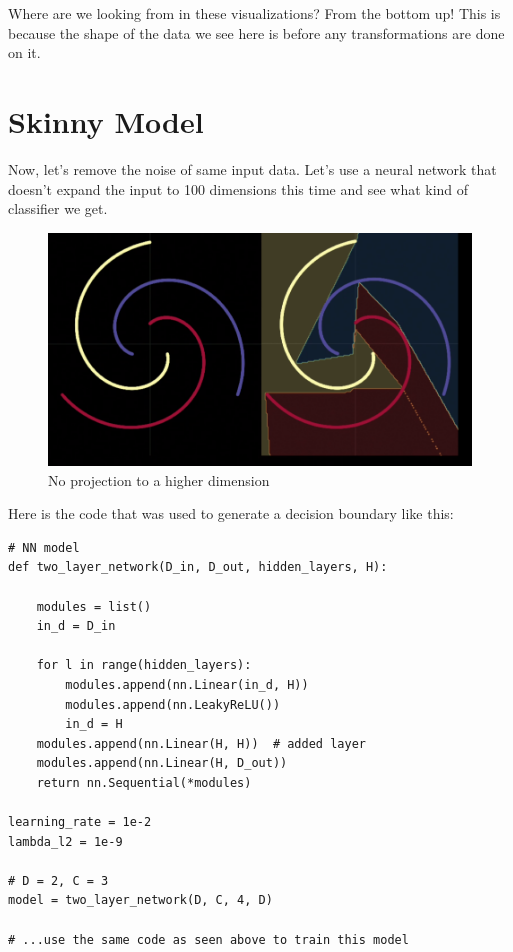 Where are we looking from in these visualizations? 
From the bottom up! 
This is because the shape of the data we see here is before any transformations are done on it. 

\section{Skinny Model}

Now, let's remove the noise of same input data. 
Let's use a neural network that doesn't expand the input to 100 dimensions this time and see what kind of classifier we get. 

\begin{figure}
	\includegraphics[width=0.85\linewidth]{lectures/03-a/images/not_wide.png}
	\caption{No projection to a higher dimension}
	\label{fig:ugly_low_dim}
\end{figure}

Here is the code that was used to generate a decision boundary like this:

\begin{verbatim}
# NN model
def two_layer_network(D_in, D_out, hidden_layers, H):

    modules = list()
    in_d = D_in

    for l in range(hidden_layers):
        modules.append(nn.Linear(in_d, H))
        modules.append(nn.LeakyReLU())
        in_d = H
    modules.append(nn.Linear(H, H))  # added layer
    modules.append(nn.Linear(H, D_out))
    return nn.Sequential(*modules)

learning_rate = 1e-2
lambda_l2 = 1e-9

# D = 2, C = 3
model = two_layer_network(D, C, 4, D)
 
# ...use the same code as seen above to train this model
\end{verbatim}

